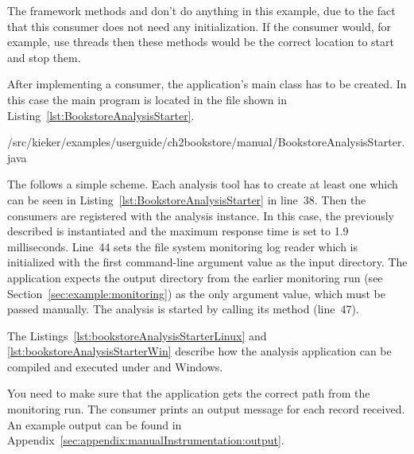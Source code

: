 The framework methods  and  don't do anything %
in this example, due to the fact that this consumer does not need any initialization. %
If the consumer would, for example, use threads then these methods would be the %
correct location to start and stop them.

After implementing a consumer, the application's main class has to be created. %
In this case the main program is located in the  %
file shown in Listing~\ref{lst:BookstoreAnalysisStarter}.

\setJavaCodeListing       
%
{\manualInstrumentedBookstoreApplicationDir/src/kieker/examples/userguide/ch2bookstore/manual/BookstoreAnalysisStarter.java}

\noindent The  follows a simple scheme. Each %
analysis tool has to create at least one  which can be %
seen in Listing~\ref{lst:BookstoreAnalysisStarter} in line~38. Then the consumers %
are registered with the analysis instance. In this case, the previously described %
 is instantiated and the maximum response time is set to 1.9 milliseconds. %
Line~44 sets the file system monitoring log reader which is initialized with the first %
command-line argument value as the input directory. The application expects the %
output directory from the earlier monitoring run (see Section~\ref{sec:example:monitoring}) %
as the only argument value, which must be passed manually. %
The analysis is started by calling its  method (line~47). %


The Listings~\ref{lst:bookstoreAnalysisStarterLinux} and \ref{lst:bookstoreAnalysisStarterWin} %
describe how the analysis application can be compiled and executed under \UnixLikeSystems{} and Windows.

\setBashListing 		

	
	

\noindent You need to make sure that the application gets the correct path from the monitoring run. 
The consumer prints an output message for each record received. %
An example output can be found in Appendix~\ref{sec:appendix:manualInstrumentation:output}.
